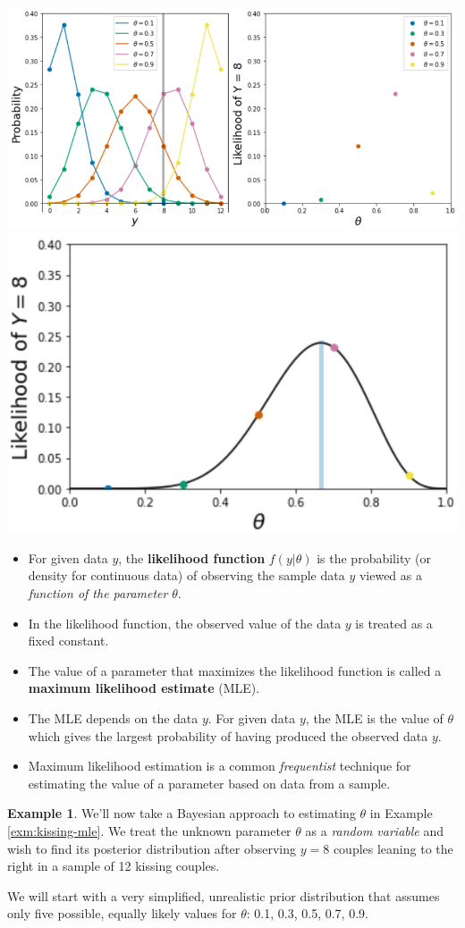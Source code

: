 \documentclass[
]{book}
\providecommand{\tightlist}{%
  \setlength{\itemsep}{0pt}\setlength{\parskip}{0pt}}
\theoremstyle{definition}
\theoremstyle{definition}
\newtheorem{example}{Example}[chapter]
\theoremstyle{definition}
\theoremstyle{remark}
\begin{document}
\includegraphics[width=0.5\linewidth]{_graphics/likelihood1} \includegraphics[width=0.5\linewidth]{_graphics/likelihood2}

\begin{itemize}
\tightlist
\item
  For given data \(y\), the \textbf{likelihood function} \(f(y|\theta)\) is the probability (or density for continuous data) of observing the sample data \(y\) viewed as a \emph{function of the parameter} \(\theta\).
\item
  In the likelihood function, the observed value of the data \(y\) is treated as a fixed constant.
\item
  The value of a parameter that maximizes the likelihood function is called a \textbf{maximum likelihood estimate} (MLE).
\item
  The MLE depends on the data \(y\). For given data \(y\), the MLE is the value of \(\theta\) which gives the largest probability of having produced the observed data \(y\).
\item
  Maximum likelihood estimation is a common \emph{frequentist} technique for estimating the value of a parameter based on data from a sample.
\end{itemize}

\begin{example}
\protect\hypertarget{exm:kissing-discrete1}{}{\label{exm:kissing-discrete1} }
We'll now take a Bayesian approach to estimating \(\theta\) in Example \ref{exm:kissing-mle}.
We treat the unknown parameter \(\theta\) as a \emph{random variable} and wish to find its posterior distribution after observing \(y=8\) couples leaning to the right in a sample of 12 kissing couples.

We will start with a very simplified, unrealistic prior distribution that assumes only five possible, equally likely values for \(\theta\): 0.1, 0.3, 0.5, 0.7, 0.9.
\end{example}
\end{document}
